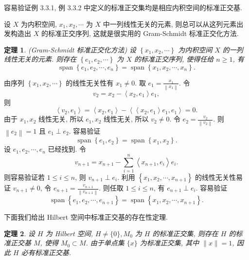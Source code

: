 \documentclass[openany]{ctexbook}
\makeatletter
\theoremstyle{kaiti}
\newtheorem{theorem}{定理}[section]
\theoremstyle{normal}
\renewenvironment{proof}[1][\proofname]{\par
    \pushQED{\qed}%
    \normalfont \topsep6\p@\@plus6\p@\relax
    \trivlist
    \item\relax
    {\heiti #1}\hspace{2\labelsep}\ignorespaces
  }{%
    \popQED\endtrivlist\@endpefalse
  }
\makeatother
\begin{document}
容易验证例 3.3.1, 例 3.3.2 中定义的标准正交集均是相应内积空间的标准正交基.

设 $X$ 为内积空间, $x_1, x_2, \cdots$ 为 $X$ 中一列线性无关的元素, 则总可以从这列元素出发构造出 $X$ 的标准正交序列, 这就是很实用的 Gram-Schmidt 标准正交化方法.

\begin{theorem}
(Gram-Schmidt 标准正交化方法) 设 $\left\{x_1, x_2, \cdots\right\}$ 为内积空间 $X$ 的一列线性无关的元素. 则存在 $\left\{e_1, e_2, \cdots\right\}$ 为 $X$ 的标准正交序列, 使得任给 $n \geqslant 1$, 有
$$
\operatorname{span}\left\{e_1, e_2, \cdots, e_n\right\}=\operatorname{span}\left\{x_1, x_2, \cdots, x_n\right\}.
$$
\end{theorem}

\begin{proof}
由序列 $\left\{x_1, x_2, \cdots\right\}$ 的线性无关性有 $x_1 \neq 0$. 取 $e_1=\frac{x_1}{\left\|x_1\right\|}$. 令
$$
v_2=x_2-\left\langle x_2, e_1\right\rangle e_1,
$$
则
$$
\left\langle v_2, e_1\right\rangle=\left\langle x_2, e_1\right\rangle-\left\langle\left\langle x_2, e_1\right\rangle e_1, e_1\right\rangle=0.
$$
由于 $x_1, x_2$ 线性无关, 所以 $e_1, x_2$ 线性无关, 所以 $v_2 \neq 0$. 令 $e_2=\frac{v_2}{\left\|v_2\right\|}$. 则 $\left\|e_2\right\|=1$ 且 $e_1 \perp e_2$. 容易验证
$$
\operatorname{span}\left\{e_1, e_2\right\}=\operatorname{span}\left\{x_1, x_2\right\}.
$$
设 $e_1, e_2, \cdots, e_n$ 已经找到. 令
$$
v_{n+1}=x_{n+1}-\sum_{i=1}^n\left\langle x_{n+1}, e_{i}\right\rangle e_{i}.
$$
则容易验证若 $1 \leqslant i \leqslant n$, 则 $v_{n+1} \perp e_{i}$. 利用 $\left\{x_1, x_2, \cdots, x_{n+1}\right\}$ 的线性无关性易证 $v_{n+1} \neq 0$, 令 $e_{n+1}=\frac{v_{n+1}}{\left\|v_{n+1}\right\|}$. 则任取 $1 \leqslant i \leqslant n$, 有 $e_{n+1} \perp e_{i}$. 容易验证
$$
\operatorname{span}\left\{e_1, e_2, \cdots, e_{n+1}\right\}=\operatorname{span}\left\{x_1, x_2, \cdots, x_{n+1}\right\}.
$$
\end{proof}

下面我们给出 Hilbert 空间中标准正交基的存在性定理.

\begin{theorem}
  设 $H$ 为 Hilbert 空间, $H \neq\{0\}, M_0$ 为 $H$ 的标准正交集, 则存在 $H$ 的标准正交基 $M$, 使得 $M_0 \subset M$. 由于单点集 $\{x\}$ 为标准正交集, 其中 $\|x\|=1$, 因此 $H$ 必有标准正交基.
\end{theorem}
\end{document}
